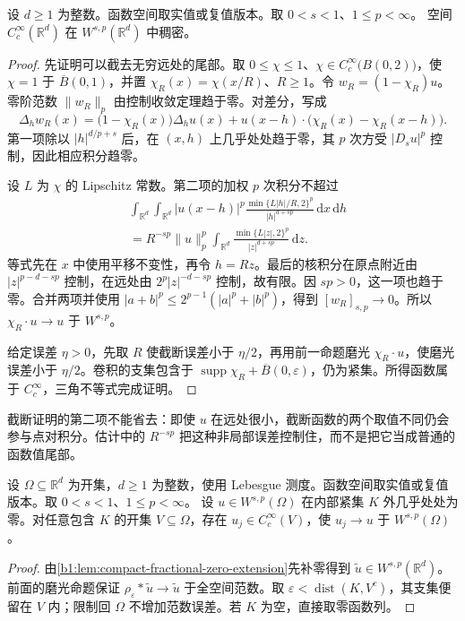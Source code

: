 \begin{theorem}\label{b1:thm:fractional-sobolev-smooth-density}
设 \(d\geq1\) 为整数。函数空间取实值或复值版本。取 \(0<s<1\)、\(1\leq p<\infty\)。
空间 \(C_c^\infty(\mathbb R^d)\) 在 \(W^{s,p}(\mathbb R^d)\) 中稠密。
\end{theorem}
\begin{proof}
先证明可以截去无穷远处的尾部。取 \(0\leq\chi\leq1\)、\(\chi\in C_c^\infty\bigl(B(0,2)\bigr)\)，使 \(\chi=1\) 于 \(\overline B(0,1)\)，并置 \(\chi_R(x)=\chi(x/R)\)、\(R\geq1\)。令 \(w_R=(1-\chi_R)u\)。零阶范数 \(\|w_R\|_p\) 由控制收敛定理趋于零。对差分，写成
\[
 \Delta_hw_R(x)
 =\bigl(1-\chi_R(x)\bigr)\Delta_hu(x)
   +u(x-h)\cdot\bigl(\chi_R(x)-\chi_R(x-h)\bigr).
\]
第一项除以 \(|h|^{d/p+s}\) 后，在 \((x,h)\) 上几乎处处趋于零，其 \(p\) 次方受 \(|D_su|^p\) 控制，因此相应积分趋零。

设 \(L\) 为 \(\chi\) 的 Lipschitz 常数。第二项的加权 \(p\) 次积分不超过
\[
 \begin{aligned}
 &\int_{\mathbb R^d}\int_{\mathbb R^d}
  |u(x-h)|^p\frac{\min\{L|h|/R,2\}^p}{|h|^{d+sp}}\,\mathrm dx\,\mathrm dh\\
 &=R^{-sp}\|u\|_p^p
      \int_{\mathbb R^d}\frac{\min\{L|z|,2\}^p}{|z|^{d+sp}}\,\mathrm dz.
 \end{aligned}
\]
等式先在 \(x\) 中使用平移不变性，再令 \(h=Rz\)。最后的核积分在原点附近由 \(|z|^{p-d-sp}\) 控制，在远处由 \(2^p|z|^{-d-sp}\) 控制，故有限。因 \(sp>0\)，这一项也趋于零。合并两项并使用 \(|a+b|^p\leq2^{p-1}(|a|^p+|b|^p)\)，得到 \([w_R]_{s,p}\to0\)。所以 \(\chi_R\cdot u\to u\) 于 \(W^{s,p}\)。

给定误差 \(\eta>0\)，先取 \(R\) 使截断误差小于 \(\eta/2\)，再用前一命题磨光 \(\chi_R\cdot u\)，使磨光误差小于 \(\eta/2\)。卷积的支集包含于 \(\operatorname{supp}\chi_R+\overline B(0,\varepsilon)\)，仍为紧集。所得函数属于 \(C_c^\infty\)，三角不等式完成证明。
\end{proof}

截断证明的第二项不能省去：即使 \(u\) 在远处很小，截断函数的两个取值不同仍会参与点对积分。估计中的 \(R^{-sp}\) 把这种非局部误差控制住，而不是把它当成普通的函数值尾部。

\begin{corollary}\label{b1:cor:compact-fractional-smooth-approximation}
设 \(\Omega\subseteq\mathbb R^d\) 为开集，\(d\geq1\) 为整数，使用 Lebesgue 测度。函数空间取实值或复值版本。取 \(0<s<1\)、\(1\leq p<\infty\)。
设 \(u\in W^{s,p}(\Omega)\) 在内部紧集 \(K\) 外几乎处处为零。对任意包含 \(K\) 的开集 \(V\subseteq\Omega\)，存在 \(u_j\in C_c^\infty(V)\)，使 \(u_j\to u\) 于 \(W^{s,p}(\Omega)\)。
\end{corollary}
\begin{proof}
由\cref{b1:lem:compact-fractional-zero-extension}先补零得到 \(\widetilde u\in W^{s,p}(\mathbb R^d)\)。前面的磨光命题保证 \(\rho_\varepsilon*\widetilde u\to\widetilde u\) 于全空间范数。取 \(\varepsilon<\operatorname{dist}(K,V^c)\)，其支集便留在 \(V\) 内；限制回 \(\Omega\) 不增加范数误差。若 \(K\) 为空，直接取零函数列。
\end{proof}

